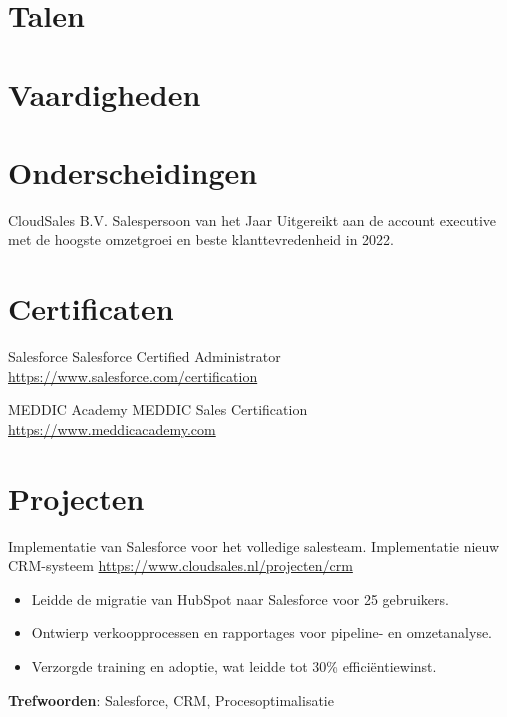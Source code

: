 \documentclass[a4paper, serif, 10pt]{moderncv}
\begin{document}
\section{Talen}

\section{Vaardigheden}

\section{Onderscheidingen}

        {CloudSales B.V.}
        {Salespersoon van het Jaar}
        {}
        {}
        {Uitgereikt aan de account executive met de hoogste omzetgroei en beste klanttevredenheid in 2022.}
\section{Certificaten}

        {Salesforce}
        {Salesforce Certified Administrator}
        {\url{https://www.salesforce.com/certification}}
        {}
        {}

        {MEDDIC Academy}
        {MEDDIC Sales Certification}
        {\url{https://www.meddicacademy.com}}
        {}
        {}
\section{Projecten}

        {Implementatie van Salesforce voor het volledige salesteam.}
        {Implementatie nieuw CRM-systeem}
        {\url{https://www.cloudsales.nl/projecten/crm}}
        {}
        {\begin{itemize}
\item Leidde de migratie van HubSpot naar Salesforce voor 25 gebruikers.
\item Ontwierp verkoopprocessen en rapportages voor pipeline- en omzetanalyse.
\item Verzorgde training en adoptie, wat leidde tot 30\% efficiëntiewinst.
\end{itemize}
\textbf{Trefwoorden}: Salesforce, CRM, Procesoptimalisatie}
\end{document}
